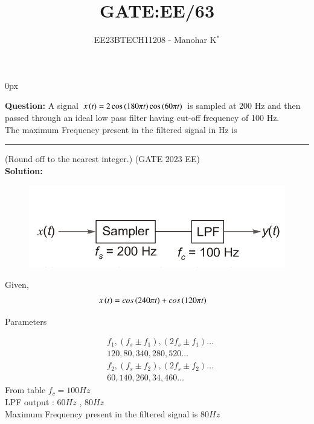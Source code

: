 \documentclass[journal,12pt,twocolumn]{IEEEtran}
\begin{document}
\parindent 0px


\vspace{3cm}

\title{GATE:EE/63}
\author{EE23BTECH11208 - Manohar K$^{*}$
}
\maketitle
\newpage
\bigskip




\textbf{Question:} \hspace{2pt} A signal $x\left(t\right)=2\cos{(180\pi t)}\cos{(60\pi t)}$ is sampled at 200 Hz and then passed through an ideal low pass filter having cut-off frequency of 100 Hz.\\
The maximum Frequency present in the filtered  signal in Hz is \rule{1cm}{0.5mm} (Round off to the nearest integer.) \hfill (GATE 2023 EE)\\
\noindent \textbf{Solution:}\\
\begin{figure}[ht]
	\centering
	\includegraphics[width=1\linewidth]{figs/answerdia.png}
\end{figure}
Given, \\

\begin{align}
	x\left(t\right)&=cos\left(240\pi t\right) + cos\left(120\pi t\right)
\end{align}
\begin{table}[h]
	\centering
	
	\caption{Parameters}
	\label{tab:GATE.EE.2023.63}
\end{table}
\begin{align}
	& f_1 , (f_s\pm f_1) , (2f_s \pm f_1) \dots\\
	& 120, 80,340,280,520 \dots\\
	& f_2 , (f_s\pm f_2) , (2f_s\pm f_2) \dots\\
	& 60 , 140,260,34,460 \dots 
	 \end{align}
From table $f_c = 100Hz$ \\
LPF output : $60Hz$ , $80Hz$\\
Maximum Frequency present in the filtered signal is $80Hz$
\end{document}
